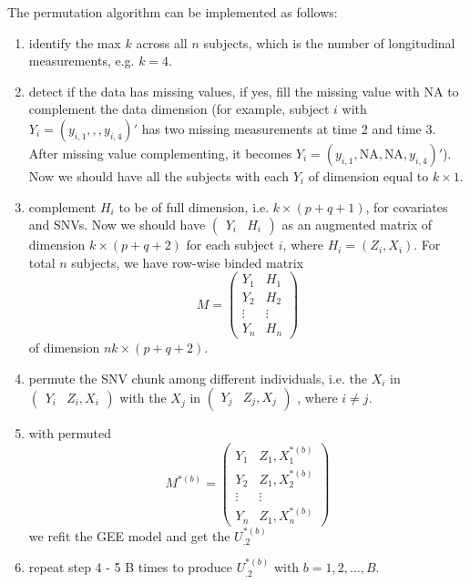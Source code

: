 \documentclass[compress]{beamer}
\begin{document}
{\framebreak
The permutation algorithm can be implemented as follows:
\begin{enumerate}
\item identify the max $k$ across all $n$ subjects, which is the number of longitudinal measurements, e.g. $k = 4$.
\item detect if the data has missing values, if yes, fill the missing value with NA to complement the data dimension (for example, subject $i$ with $Y_{i} = ( y_{i,1},,,y_{i,4} )'$ has two missing measurements at time 2 and time 3. After missing value complementing, it becomes $Y_{i} = ( y_{i,1},\textrm{NA},\textrm{NA},y_{i,4} )'$). Now we should have all the subjects with each $Y_{i}$ of dimension equal to $k \times 1$.  
\item complement $H_i$ to be of full dimension, i.e. $k \times (p + q + 1)$, for covariates and SNVs. Now we should have
$\begin{pmatrix}
Y_i & H_i
\end{pmatrix}$
as an augmented matrix of dimension $k \times (p + q + 2)$ for each subject $i$, where $H_i = (Z_i,X_i)$. For total $n$ subjects, we have row-wise binded matrix
$$
M = 
\begin{pmatrix}
Y_1 & H_1\\
Y_2 & H_2\\
\vdots & \vdots\\
Y_n & H_n
\end{pmatrix}
$$ 
of dimension $nk \times (p + q + 2)$.
\item permute the SNV chunk among different individuals, i.e. the $X_i$ in
$\begin{pmatrix}
Y_i & Z_i,X_i
\end{pmatrix}$ 
with the $X_j$ in 
$\begin{pmatrix}
Y_j & Z_j,X_j
\end{pmatrix}$
, where $i \neq j$. 
\item with permuted 
$$
M^{*(b)} = 
\begin{pmatrix}
Y_1 & Z_1, X_1^{*(b)}\\
Y_2 & Z_1, X_2^{*(b)}\\
\vdots & \vdots\\
Y_n & Z_1, X_n^{*(b)}
\end{pmatrix}
$$
we refit the GEE model and get the $ U_{.2}^{ *(b) } $
\item repeat step 4 - 5 B times to produce $U_{.2}^{ *(b) }$ with $b = 1,2,\ldots,B$.
\end{enumerate}
}
\end{document}
